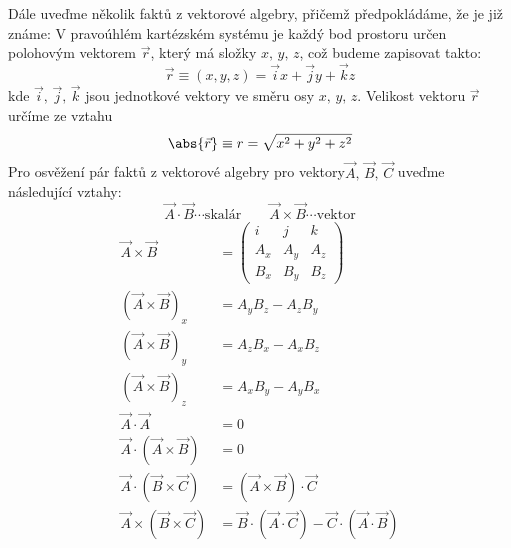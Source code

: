       Dále uveďme několik faktů z vektorové algebry, přičemž předpokládáme, že je již známe: V 
      pravoúhlém kartézském systému je každý bod prostoru určen polohovým vektorem $\vec{r}$, který 
      má složky $x,\,y,\,z$, což budeme zapisovat takto:
      \begin{equation}\label{fyz:eq688}
        \vec{r}\equiv(x,y,z)=\vec{i}x+\vec{j}y+\vec{k}z
      \end{equation}
      kde $\vec{i},\,\vec{j},\,\vec{k}$ jsou jednotkové vektory ve směru osy $x,\,y,\,z$. Velikost 
      vektoru $\vec{r}$ určíme ze vztahu
      \begin{equation}\label{fyz:eq689}
        \abs{\vec{r}}\equiv r = \sqrt{x^2+y^2+z^2}
      \end{equation}
      Pro osvěžení pár faktů z vektorové algebry pro vektory$\vec{A},\,\vec{B},\,\vec{C}$ uveďme 
      následující vztahy: 
      \begin{equation*}
        \vec{A}\cdot \vec{B}\cdots\text{skalár} \quad\quad                        
        \vec{A}\times\vec{B}\cdots \mathrm{vektor}   
      \end{equation*}
      \begin{subequations}
        \begin{align}
          \vec{A}\times\vec{B}    
            &=  \left(
                  \begin{array}{ccc}
                    i  &  j  &  k    \\
                    A_x & A_y & A_z  \\
                    B_x & B_y & B_z
                  \end{array}
                \right)                                                                  \\
        (\vec{A}\times \vec{B})_x 
          &= A_yB_z-A_zB_y \label{fyz:eq690}                                   \nonumber \\
        (\vec{A}\times \vec{B})_y 
          &= A_zB_x-A_xB_z                                                     \nonumber \\
        (\vec{A}\times \vec{B})_z 
          &= A_xB_y-A_yB_x                                                     \nonumber \\
          \vec{A}\cdot  \vec{A}     
          &= 0                                                                           \\
          \vec{A}\cdot (\vec{A}\times\vec{B})   
          &= 0                                                                           \\          
          \vec{A}\cdot (\vec{B}\times\vec{C})  
          &= (\vec{A}\times \vec{B})\cdot\vec{C}                                         \\
          \vec{A}\times(\vec{B}\times\vec{C})  
          &= \vec{B}\cdot (\vec{A} \cdot\vec{C})
              -\vec{C}\cdot (\vec{A} \cdot\vec{B})              \label{fey:eq_baccab}          
        \end{align}
      \end{subequations}
